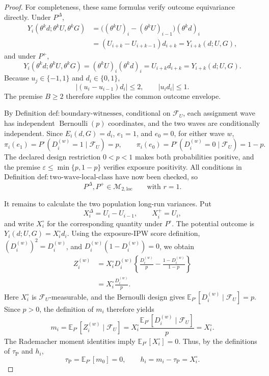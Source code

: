 \documentclass{article}
\begin{document}
\begin{proof}
For completeness, these same formulas verify outcome equivariance directly.  Under \(P^{\Delta}\),
\[
\begin{aligned}
 Y_i(\theta^kd;\theta^kU,\theta^kG)
 &=\bigl((\theta^kU)_i-(\theta^kU)_{i-1}\bigr)(\theta^kd)_i\\
 &=(U_{i+k}-U_{i+k-1})d_{i+k}
 =Y_{i+k}(d;U,G),
\end{aligned}
\]
and under \(P^+\),
\[
 Y_i(\theta^kd;\theta^kU,\theta^kG)
 = (\theta^kU)_i(\theta^kd)_i
 = U_{i+k}d_{i+k}
 =Y_{i+k}(d;U,G).
\]
Because \(u_j\in\{-1,1\}\) and \(d_i\in\{0,1\}\),
\[
 |(u_i-u_{i-1})d_i|\le2,
 \qquad
 |u_id_i|\le1.
\]
The premise \(B\ge2\) therefore supplies the common outcome envelope.

By Definition \(\mathrm{def{:}boundary\text{-}witnesses}\), conditional on \(\mathcal F_U\), each assignment wave has independent \(\operatorname{Bernoulli}(p)\) coordinates, and the two waves are conditionally independent.  Since \(E_i(d,G)=d_i\), \(e_1=1\), and \(e_0=0\), for either wave \(w\),
\[
 \pi_i(e_1)=P^{\circ}(D_i^{(w)}=1\mid\mathcal F_U)=p,
 \qquad
 \pi_i(e_0)=P^{\circ}(D_i^{(w)}=0\mid\mathcal F_U)=1-p.
\]
The declared design restriction \(0<p<1\) makes both probabilities positive, and the premise \(\varepsilon\le\min\{p,1-p\}\) verifies exposure positivity.  All conditions in Definition \(\mathrm{def{:}two\text{-}wave\text{-}local\text{-}class}\) have now been checked, so
\[
 P^{\Delta},P^+\in\mathcal M_{2,\mathrm{loc}}
 \qquad\text{with }r=1.
\]

It remains to calculate the two population long-run variances.  Put
\[
 X_i^{\Delta}=U_i-U_{i-1},
 \qquad
 X_i^+=U_i,
\]
and write \(X_i^{\circ}\) for the corresponding quantity under \(P^{\circ}\).  The potential outcome is \(Y_i(d;U,G)=X_i^{\circ}d_i\).  Using the exposure-IPW score definition, \((D_i^{(w)})^2=D_i^{(w)}\), and \(D_i^{(w)}(1-D_i^{(w)})=0\), we obtain
\[
\begin{aligned}
 Z_i^{(w)}
 &=X_i^{\circ}D_i^{(w)}
 \left\{
   \frac{D_i^{(w)}}p-
   \frac{1-D_i^{(w)}}{1-p}
 \right\}\\
 &=X_i^{\circ}\frac{D_i^{(w)}}p.
\end{aligned}
\]
Here \(X_i^{\circ}\) is \(\mathcal F_U\)-measurable, and the Bernoulli design gives \(\mathbb E_{P^{\circ}}[D_i^{(w)}\mid\mathcal F_U]=p\).  Since \(p>0\), the definition of \(m_i\) therefore yields
\[
 m_i=\mathbb E_{P^{\circ}}[Z_i^{(w)}\mid\mathcal F_U]
 =X_i^{\circ}\frac{\mathbb E_{P^{\circ}}[D_i^{(w)}\mid\mathcal F_U]}p
 =X_i^{\circ}.
\]
The Rademacher moment identities imply \(\mathbb E_{P^{\circ}}[X_i^{\circ}]=0\).  Thus, by the definitions of \(\tau_{\mathrm P}\) and \(h_i\),
\[
 \tau_{\mathrm P}=\mathbb E_{P^{\circ}}[m_0]=0,
 \qquad
 h_i=m_i-\tau_{\mathrm P}=X_i^{\circ}.
\]


\end{proof}
\end{document}
